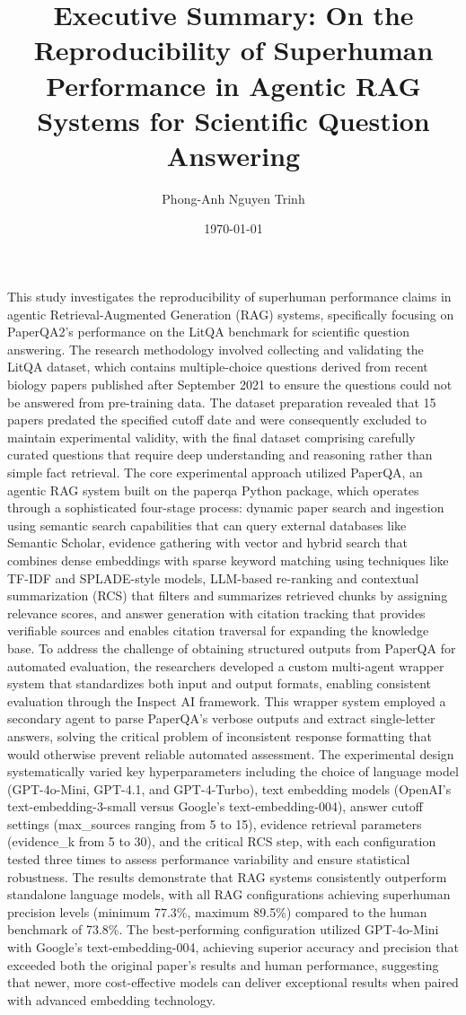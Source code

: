 \documentclass[12pt,a4paper]{article}
\title{\textbf{Executive Summary: On the Reproducibility of Superhuman Performance in Agentic RAG Systems for Scientific Question Answering}}
\author{Phong-Anh Nguyen Trinh}
\date{\today}
\begin{document}
\maketitle

This study investigates the reproducibility of superhuman performance claims in agentic Retrieval-Augmented Generation (RAG) systems, specifically focusing on PaperQA2's performance on the LitQA benchmark for scientific question answering. The research methodology involved collecting and validating the LitQA dataset, which contains multiple-choice questions derived from recent biology papers published after September 2021 to ensure the questions could not be answered from pre-training data. The dataset preparation revealed that 15 papers predated the specified cutoff date and were consequently excluded to maintain experimental validity, with the final dataset comprising carefully curated questions that require deep understanding and reasoning rather than simple fact retrieval. The core experimental approach utilized PaperQA, an agentic RAG system built on the paperqa Python package, which operates through a sophisticated four-stage process: dynamic paper search and ingestion using semantic search capabilities that can query external databases like Semantic Scholar, evidence gathering with vector and hybrid search that combines dense embeddings with sparse keyword matching using techniques like TF-IDF and SPLADE-style models, LLM-based re-ranking and contextual summarization (RCS) that filters and summarizes retrieved chunks by assigning relevance scores, and answer generation with citation tracking that provides verifiable sources and enables citation traversal for expanding the knowledge base. To address the challenge of obtaining structured outputs from PaperQA for automated evaluation, the researchers developed a custom multi-agent wrapper system that standardizes both input and output formats, enabling consistent evaluation through the Inspect AI framework. This wrapper system employed a secondary agent to parse PaperQA's verbose outputs and extract single-letter answers, solving the critical problem of inconsistent response formatting that would otherwise prevent reliable automated assessment. The experimental design systematically varied key hyperparameters including the choice of language model (GPT-4o-Mini, GPT-4.1, and GPT-4-Turbo), text embedding models (OpenAI's text-embedding-3-small versus Google's text-embedding-004), answer cutoff settings (max\_sources ranging from 5 to 15), evidence retrieval parameters (evidence\_k from 5 to 30), and the critical RCS step, with each configuration tested three times to assess performance variability and ensure statistical robustness. The results demonstrate that RAG systems consistently outperform standalone language models, with all RAG configurations achieving superhuman precision levels (minimum 77.3\%, maximum 89.5\%) compared to the human benchmark of 73.8\%. The best-performing configuration utilized GPT-4o-Mini with Google's text-embedding-004, achieving superior accuracy and precision that exceeded both the original paper's results and human performance, suggesting that newer, more cost-effective models can deliver exceptional results when paired with advanced embedding technology. 
\end{document}
